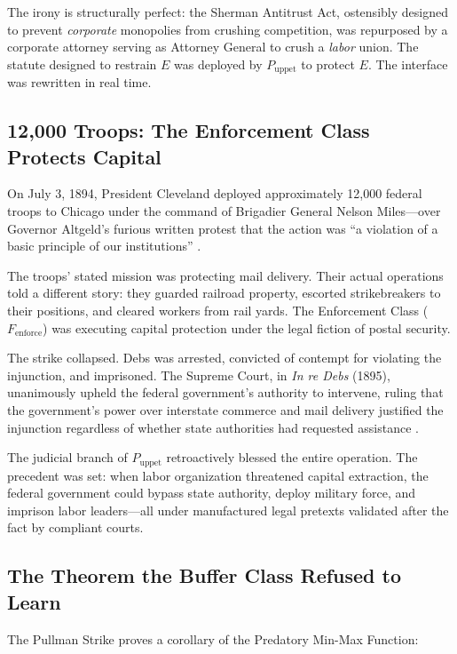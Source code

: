 The irony is structurally perfect: the Sherman Antitrust Act, ostensibly designed to prevent \textit{corporate} monopolies from crushing competition, was repurposed by a corporate attorney serving as Attorney General to crush a \textit{labor} union. The statute designed to restrain $E$ was deployed by $P_{\text{uppet}}$ to protect $E$. The interface was rewritten in real time.

\subsection{12,000 Troops: The Enforcement Class Protects Capital}

On July 3, 1894, President Cleveland deployed approximately 12,000 federal troops to Chicago under the command of Brigadier General Nelson Miles---over Governor Altgeld's furious written protest that the action was ``a violation of a basic principle of our institutions'' \cite{lindsey_pullman}.

The troops' stated mission was protecting mail delivery. Their actual operations told a different story: they guarded railroad property, escorted strikebreakers to their positions, and cleared workers from rail yards. The Enforcement Class ($F_{\text{enforce}}$) was executing capital protection under the legal fiction of postal security.

The strike collapsed. Debs was arrested, convicted of contempt for violating the injunction, and imprisoned. The Supreme Court, in \textit{In re Debs} (1895), unanimously upheld the federal government's authority to intervene, ruling that the government's power over interstate commerce and mail delivery justified the injunction regardless of whether state authorities had requested assistance \cite{inredebs}.

The judicial branch of $P_{\text{uppet}}$ retroactively blessed the entire operation. The precedent was set: when labor organization threatened capital extraction, the federal government could bypass state authority, deploy military force, and imprison labor leaders---all under manufactured legal pretexts validated after the fact by compliant courts.

\subsection{The Theorem the Buffer Class Refused to Learn}

The Pullman Strike proves a corollary of the Predatory Min-Max Function:

